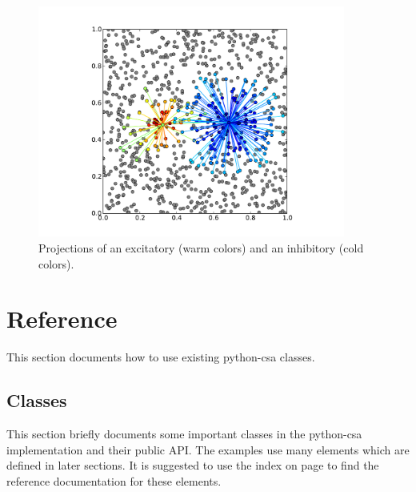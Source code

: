\documentclass[a4paper,twoside]{report}
\makeatletter
\newenvironment{parameters}%
{\begin{tabular}{@{\hspace{2em}}lp{0.6\textwidth}}}%
{\end{tabular}\par\vspace{1mm}\par\hrule\par\vspace{5mm}}
\newcommand{\ret}{\emph{return value}}
\makeatother
\begin{document}
\begin{figure}
  \begin{center}
    \includegraphics[width=0.9\textwidth]{figures/gaussnet}
    \caption[Projections of an excitatory and an inhibitory neuron]{\label{fig:gaussnet}
      Projections of an excitatory (warm colors) and an inhibitory
      (cold colors).
    }
  \end{center}
\end{figure}

\chapter{Reference}\label{sec:reference}


This section documents how to use existing python-csa classes.

\section{Classes}
This section briefly documents some important classes in the
python-csa implementation and their public API.  The examples use many
elements which are defined in later sections.  It is suggested to use
the index on page \pageref{sec:index} to find the reference
documentation for these elements.
\end{document}
